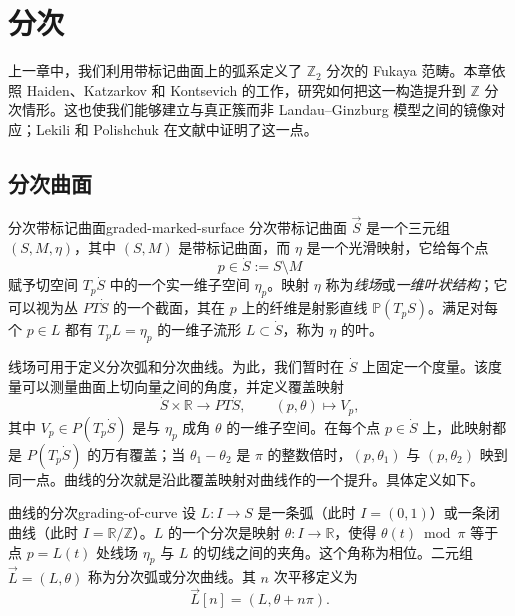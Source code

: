 \chapter{分次}\label{ch:grading}

上一章中，我们利用带标记曲面上的弧系定义了 $\mathbb Z_2$ 分次的 Fukaya 范畴。本章依照 Haiden、Katzarkov 和 Kontsevich 的工作，研究如何把这一构造提升到 $\mathbb Z$ 分次情形。这也使我们能够建立与真正簇而非 Landau--Ginzburg 模型之间的镜像对应；Lekili 和 Polishchuk 在文献中证明了这一点。

\section{分次曲面}\label{sec:graded-surfaces}
\begin{definition}{分次带标记曲面}{graded-marked-surface}
分次带标记曲面 $\vec S$ 是一个三元组 $(S,M,\eta)$，其中 $(S,M)$ 是带标记曲面，而 $\eta$ 是一个光滑映射，它给每个点
\[
  p\in\dot S:=S\setminus M
\]
赋予切空间 $T_p\dot S$ 中的一个实一维子空间 $\eta_p$。映射 $\eta$ 称为\emph{线场}或\emph{一维叶状结构}；它可以视为丛 $P T\dot S$ 的一个截面，其在 $p$ 上的纤维是射影直线 $\mathbb P(T_pS)$。满足对每个 $p\in L$ 都有 $T_pL=\eta_p$ 的一维子流形 $L\subset\dot S$，称为 $\eta$ 的叶。
\end{definition}

线场可用于定义分次弧和分次曲线。为此，我们暂时在 $\dot S$ 上固定一个度量。该度量可以测量曲面上切向量之间的角度，并定义覆盖映射
\[
  \dot S\times\mathbb R\longrightarrow P T\dot S,\qquad (p,\theta)\longmapsto V_p,
\]
其中 $V_p\in P(T_p\dot S)$ 是与 $\eta_p$ 成角 $\theta$ 的一维子空间。在每个点 $p\in\dot S$ 上，此映射都是 $P(T_p\dot S)$ 的万有覆盖；当 $\theta_1-\theta_2$ 是 $\pi$ 的整数倍时，$(p,\theta_1)$ 与 $(p,\theta_2)$ 映到同一点。曲线的分次就是沿此覆盖映射对曲线作的一个提升。具体定义如下。

\begin{definition}{曲线的分次}{grading-of-curve}
设 $L\colon I\to S$ 是一条弧（此时 $I=(0,1)$）或一条闭曲线（此时 $I=\mathbb R/\mathbb Z$）。$L$ 的一个分次是映射 $\theta\colon I\to\mathbb R$，使得 $\theta(t)\bmod\pi$ 等于点 $p=L(t)$ 处线场 $\eta_p$ 与 $L$ 的切线之间的夹角。这个角称为相位。二元组 $\vec L=(L,\theta)$ 称为分次弧或分次曲线。其 $n$ 次平移定义为
\[
  \vec L[n]=(L,\theta+n\pi).
\]
\end{definition}

